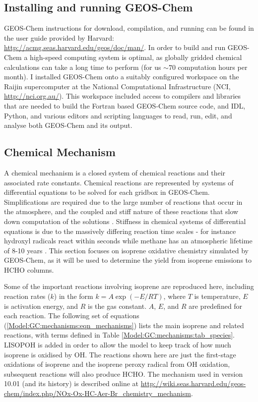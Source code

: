   \subsection{Installing and running GEOS-Chem}
    \label{Model:GC:running}
    GEOS-Chem instructions for download, compilation, and running can be found in the user guide provided by Harvard: \url{http://acmg.seas.harvard.edu/geos/doc/man/}.
    In order to build and run GEOS-Chem a high-speed computing system is optimal, as globally gridded chemical calculations can take a long time to perform (for us $\sim 70$ computation hours per month).
    I installed GEOS-Chem onto a suitably configured workspace on the Raijin supercomputer at the National Computational Infrastructure (NCI, \url{http://nci.org.au/}).
    This workspace included access to compilers and libraries that are needed to build the Fortran based GEOS-Chem source code, and IDL, Python, and various editors and scripting languages to read, run, edit, and analyse both GEOS-Chem and its output.

  \subsection{Chemical Mechanism}
    \label{Model:GC:mechanisms}
    A chemical mechanism is a closed system of chemical reactions and their associated rate constants.
    Chemical reactions are represented by systems of differential equations to be solved for each gridbox in GEOS-Chem.
    Simplifications are required due to the large number of reactions that occur in the atmosphere, and the coupled and stiff nature of these reactions that slow down computation of the solutions \parencite{BrasseurJacob2017}.
    Stiffness in chemical systems of differential equations is due to the massively differing reaction time scales - for instance hydroxyl radicals react within seconds while methane has an atmospheric lifetime of 8-10 years \parencite{Wuebbles2002}. 
    This section focuses on isoprene oxidative chemistry simulated by GEOS-Chem, as it will be used to determine the yield from isoprene emissions to HCHO columns. 

    Some of the important reactions involving isoprene are reproduced here, including reaction rates ($k$) in the form $ k = A \exp{(-E/RT)}$, where $T$ is temperature, $E$ is activation energy, and $R$ is the gas constant.
    $A$, $E$, and $R$ are predefined for each reaction.
    The following set of equations (\ref{Model:GC:mechanisms:eqn_mechanisms}) lists the main isoprene and related reactions, with terms defined in Table \ref{Model:GC:mechanisms:tab_species}.
    LISOPOH is added in order to allow the model to keep track of how much isoprene is oxidised by OH.
    The reactions shown here are just the first-stage oxidations of isoprene and the isoprene peroxy radical from OH oxidation, subsequent reactions will also produce HCHO.
    The mechanism used in version 10.01 (and its history) is described online at \url{http://wiki.seas.harvard.edu/geos-chem/index.php/NOx-Ox-HC-Aer-Br_chemistry_mechanism}.
    
